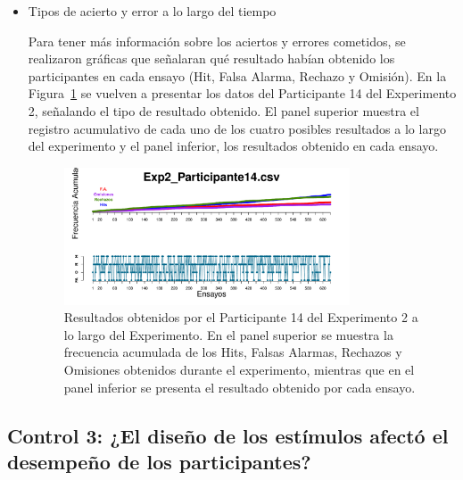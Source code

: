 \begin{itemize}


	\item Tipos de acierto y error a lo largo del tiempo

Para tener más información sobre los aciertos y errores cometidos, se realizaron gráficas que señalaran qué resultado habían obtenido los participantes en cada ensayo (Hit, Falsa Alarma, Rechazo y Omisión). En la Figura~\ref{fig:Outcome_E2_P14} se vuelven a presentar los datos del Participante 14 del Experimento 2, señalando el tipo de resultado obtenido. El panel superior muestra el registro acumulativo de cada uno de los cuatro posibles resultados a lo largo del experimento y el panel inferior, los resultados obtenido en cada ensayo.\\ 

\begin{figure}[th]
\centering
\includegraphics[width=0.80\textwidth]{Figures/Outcome_Exp2_P14}
\caption[Resultado obtenido a lo largo del tiempo: Ejemplo]{Resultados obtenidos por el Participante 14 del Experimento 2 a lo largo del Experimento. En el panel superior se muestra la frecuencia acumulada de los Hits, Falsas Alarmas, Rechazos y Omisiones obtenidos durante el experimento, mientras que en el panel inferior se presenta el resultado obtenido por cada ensayo.}
\label{fig:Outcome_E2_P14}
\end{figure}


\end{itemize}










\subsection{Control 3: ¿El diseño de los estímulos afectó el desempeño de los participantes?}

